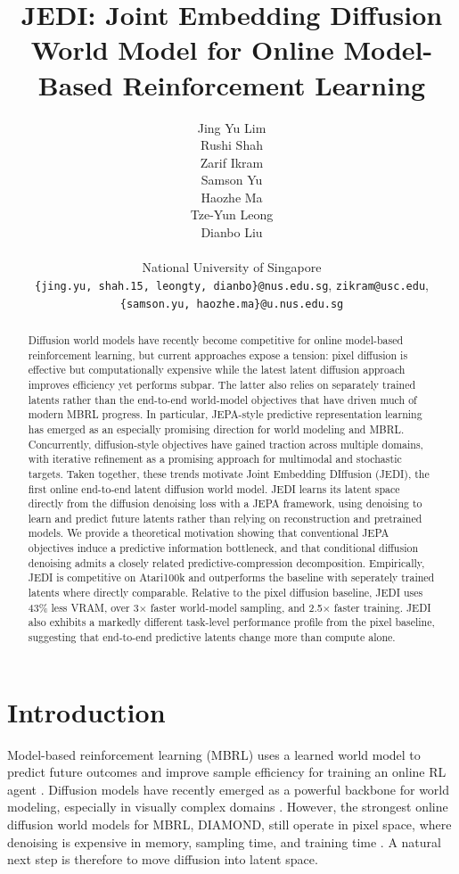 \documentclass{article}
\title{
JEDI: Joint Embedding Diffusion World Model for Online Model-Based Reinforcement Learning}
\author{%
  Jing Yu Lim \\
  \And
  Rushi Shah\\
  \And
  Zarif Ikram\\
  \And
   Samson Yu\\
   \And
   Haozhe Ma\\
   \And
   Tze-Yun Leong\\
   \And
   Dianbo Liu\\\\
   National University of Singapore\\
   \texttt{\{jing.yu, shah.15, leongty, dianbo\}@nus.edu.sg}, 
   \texttt{zikram@usc.edu},\\ 
   \texttt{\{samson.yu, haozhe.ma\}@u.nus.edu.sg}\\
}
\begin{document}
\maketitle

\begin{abstract}
Diffusion world models have recently become competitive for online model-based reinforcement learning, but current approaches expose a tension: pixel diffusion is effective but computationally expensive while the latest latent diffusion approach improves efficiency yet performs subpar. The latter also relies on separately trained latents rather than the end-to-end world-model objectives that have driven much of modern MBRL progress. In particular, JEPA-style predictive representation learning has emerged as an especially promising direction for world modeling and MBRL. Concurrently, diffusion-style objectives have gained traction across multiple domains, with iterative refinement as a promising approach for multimodal and stochastic targets. Taken together, these trends motivate Joint Embedding DIffusion (JEDI), the first online end-to-end latent diffusion world model. JEDI learns its latent space directly from the diffusion denoising loss with a JEPA framework, using denoising to learn and predict future latents rather than relying on reconstruction and pretrained models. We provide a theoretical motivation showing that conventional JEPA objectives induce a predictive information bottleneck, and that conditional diffusion denoising admits a closely related predictive-compression decomposition. Empirically, JEDI is competitive on Atari100k and outperforms the baseline with seperately trained latents where directly comparable. Relative to the pixel diffusion baseline, JEDI uses 43\% less VRAM, over 3$\times$ faster world-model sampling, and 2.5$\times$ faster training. JEDI also exhibits a markedly different task-level performance profile from the pixel baseline, suggesting that end-to-end predictive latents change more than compute alone.
\end{abstract}

\section{Introduction}
\label{sec:intro}
Model-based reinforcement learning (MBRL) uses a learned world model \citep{sutton1991DYNA,ha2018World} to predict future outcomes and improve sample efficiency for training an online RL agent \citep{Hafner2020Dreamer}. Diffusion models have recently emerged as a powerful backbone for world modeling, especially in visually complex domains \citep{liu2024sora,parkerholder2024genie2,blattmann2023StableVideoDiff}. However, the strongest online diffusion world models for MBRL, DIAMOND, still operate in pixel space, where denoising is expensive in memory, sampling time, and training time \citep{alonso2024diamond}. A natural next step is therefore to move diffusion into latent space.
\end{document}
